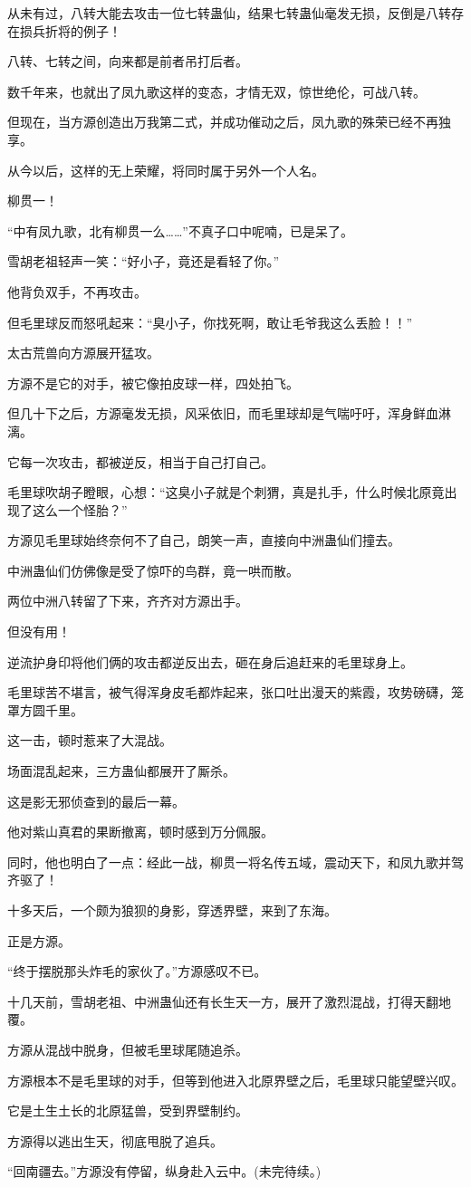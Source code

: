 \begin{this_body}
从未有过，八转大能去攻击一位七转蛊仙，结果七转蛊仙毫发无损，反倒是八转存在损兵折将的例子！

八转、七转之间，向来都是前者吊打后者。

数千年来，也就出了凤九歌这样的变态，才情无双，惊世绝伦，可战八转。

但现在，当方源创造出万我第二式，并成功催动之后，凤九歌的殊荣已经不再独享。

从今以后，这样的无上荣耀，将同时属于另外一个人名。

柳贯一！

“中有凤九歌，北有柳贯一么……”不真子口中呢喃，已是呆了。

雪胡老祖轻声一笑：“好小子，竟还是看轻了你。”

他背负双手，不再攻击。

但毛里球反而怒吼起来：“臭小子，你找死啊，敢让毛爷我这么丢脸！！”

太古荒兽向方源展开猛攻。

方源不是它的对手，被它像拍皮球一样，四处拍飞。

但几十下之后，方源毫发无损，风采依旧，而毛里球却是气喘吁吁，浑身鲜血淋漓。

它每一次攻击，都被逆反，相当于自己打自己。

毛里球吹胡子瞪眼，心想：“这臭小子就是个刺猬，真是扎手，什么时候北原竟出现了这么一个怪胎？”

方源见毛里球始终奈何不了自己，朗笑一声，直接向中洲蛊仙们撞去。

中洲蛊仙们仿佛像是受了惊吓的鸟群，竟一哄而散。

两位中洲八转留了下来，齐齐对方源出手。

但没有用！

逆流护身印将他们俩的攻击都逆反出去，砸在身后追赶来的毛里球身上。

毛里球苦不堪言，被气得浑身皮毛都炸起来，张口吐出漫天的紫霞，攻势磅礴，笼罩方圆千里。

这一击，顿时惹来了大混战。

场面混乱起来，三方蛊仙都展开了厮杀。

这是影无邪侦查到的最后一幕。

他对紫山真君的果断撤离，顿时感到万分佩服。

同时，他也明白了一点：经此一战，柳贯一将名传五域，震动天下，和凤九歌并驾齐驱了！

十多天后，一个颇为狼狈的身影，穿透界壁，来到了东海。

正是方源。

“终于摆脱那头炸毛的家伙了。”方源感叹不已。

十几天前，雪胡老祖、中洲蛊仙还有长生天一方，展开了激烈混战，打得天翻地覆。

方源从混战中脱身，但被毛里球尾随追杀。

方源根本不是毛里球的对手，但等到他进入北原界壁之后，毛里球只能望壁兴叹。

它是土生土长的北原猛兽，受到界壁制约。

方源得以逃出生天，彻底甩脱了追兵。

“回南疆去。”方源没有停留，纵身赴入云中。(未完待续。)

\end{this_body}

